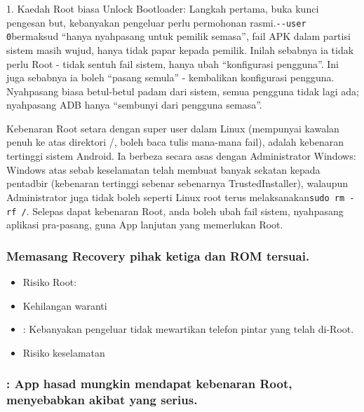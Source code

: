 \begin{tcbinfo}{1. Kaedah Root biasa}
Unlock Bootloader: Langkah pertama, buka kunci pengesan but, kebanyakan pengeluar perlu permohonan rasmi.\texttt{-\allowbreak -\allowbreak user 0}bermaksud “hanya nyahpasang untuk pemilik semasa”, fail APK dalam partisi sistem masih wujud, hanya tidak papar kepada pemilik. Inilah sebabnya ia tidak perlu Root - tidak sentuh fail sistem, hanya ubah “konfigurasi pengguna”. Ini juga sebabnya ia boleh “pasang semula” - kembalikan konfigurasi pengguna. Nyahpasang biasa betul-betul padam dari sistem, semua pengguna tidak lagi ada; nyahpasang ADB hanya “sembunyi dari pengguna semasa”.

\end{tcbinfo}


Kebenaran Root setara dengan super user dalam Linux (mempunyai kawalan penuh ke atas direktori /, boleh baca tulis mana-mana fail), adalah kebenaran tertinggi sistem Android. Ia berbeza secara asas dengan Administrator Windows: Windows atas sebab keselamatan telah membuat banyak sekatan kepada pentadbir (kebenaran tertinggi sebenar sebenarnya TrustedInstaller), walaupun Administrator juga tidak boleh seperti Linux root terus melaksanakan\texttt{sudo rm -\allowbreak rf /\allowbreak *}. Selepas dapat kebenaran Root, anda boleh ubah fail sistem, nyahpasang aplikasi pra-pasang, guna App lanjutan yang memerlukan Root.

\subsubsection*{Memasang Recovery pihak ketiga dan ROM tersuai.}

\begin{itemize}
  \item Risiko Root:
  \item Kehilangan waranti
  \item : Kebanyakan pengeluar tidak mewartikan telefon pintar yang telah di-Root.
  \item Risiko keselamatan
\end{itemize}

\subsubsection*{: App hasad mungkin mendapat kebenaran Root, menyebabkan akibat yang serius.}


